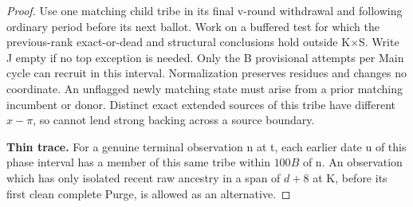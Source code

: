 \begin{proof}
Use one matching child tribe in its final v-round withdrawal and following ordinary period before its next ballot. Work on a buffered test for which the previous-rank exact-or-dead and structural conclusions hold outside K\(\times\)S. Write J empty if no top exception is needed. Only the B provisional attempts per Main cycle can recruit in this interval. Normalization preserves residues and changes no coordinate. An unflagged newly matching state must arise from a prior matching incumbent or donor. Distinct exact extended sources of this tribe have different \(x- \pi \), so cannot lend strong backing across a source boundary.

\textbf{Thin trace.} For a genuine terminal observation n at t, each earlier date u of this phase interval has a member of this same tribe within \(100B\) of n. An observation which has only isolated recent raw ancestry in a span of \(d+8\) at K, before its first clean complete Purge, is allowed as an alternative.


\end{proof}
